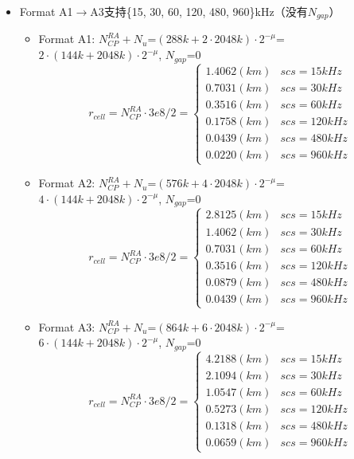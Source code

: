 \documentclass{article}
\begin{document}
\begin{itemize}
\item Format A1$\to$A3支持\{15, 30, 60, 120, 480, 960\}kHz（没有$N_{gap}$）
\begin{itemize}
\item Format A1: $N_{CP}^{RA} + N_u$=$(288k+2\cdot 2048k)\cdot 2^{-\mu}$=$2\cdot(144k+2048k)\cdot 2^{-\mu}$, $N_{gap}$=0
\[
r_{cell} = N_{CP}^{RA}\cdot 3e8/2=\begin{cases}
1.4062(km) & scs=15kHz \\
0.7031(km) & scs=30kHz \\
0.3516(km) & scs=60kHz \\
0.1758(km) & scs=120kHz \\
0.0439(km) & scs=480kHz \\
0.0220(km) & scs=960kHz
\end{cases}
\]
\item Format A2: $N_{CP}^{RA} + N_u$=$(576k+4\cdot 2048k)\cdot 2^{-\mu}$=$4\cdot(144k+2048k)\cdot 2^{-\mu}$, $N_{gap}$=0
\[
r_{cell} = N_{CP}^{RA}\cdot 3e8/2=\begin{cases}
2.8125(km) & scs=15kHz \\
1.4062(km) & scs=30kHz \\
0.7031 (km) & scs=60kHz \\
0.3516(km) & scs=120kHz \\
0.0879(km) & scs=480kHz \\
0.0439(km) & scs=960kHz
\end{cases}
\]
\item Format A3: $N_{CP}^{RA} + N_u$=$(864k+6\cdot 2048k)\cdot 2^{-\mu}$=$6\cdot(144k+2048k)\cdot 2^{-\mu}$, $N_{gap}$=0
\[
r_{cell} = N_{CP}^{RA}\cdot 3e8/2=\begin{cases}
4.2188(km) & scs=15kHz \\
2.1094(km) & scs=30kHz \\
1.0547(km) & scs=60kHz \\
0.5273(km) & scs=120kHz \\
0.1318(km) & scs=480kHz \\
0.0659(km) & scs=960kHz
\end{cases}
\]
\end{itemize}


\end{itemize}
\end{document}
